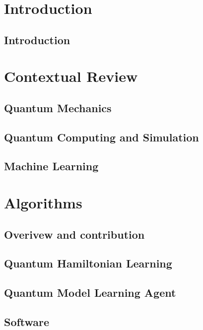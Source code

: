 
\part*{Introduction}\label{part:intro}
    \chapter{Introduction}\label{chapter:intro}
        

\part{Contextual Review}\label{part:contextual_review}
    \chapter{Quantum Mechanics}\label{chapter:qm}
        
    \chapter{Quantum Computing and Simulation}\label{chapter:qc}
        
    \chapter{Machine Learning}\label{chapter:ml}
        

\part{Algorithms}\label{part:algorithms}
    \chapter*{Overivew and contribution}
        
    \chapter{Quantum Hamiltonian Learning}\label{chapter:qhl}
        
    \chapter{Quantum Model Learning Agent}\label{chapter:qmla}
        
    \chapter{Software}\label{chapter:sw}
        

